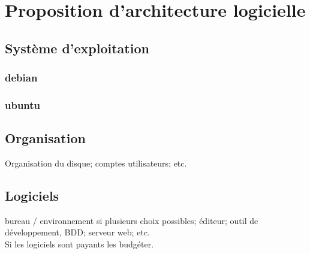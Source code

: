 \chapter{Proposition d'architecture logicielle}

\section{Système d'exploitation}

\subsection{debian}

\subsection{ubuntu}

\section{Organisation}

Organisation du disque; comptes utilisateurs; etc.

\section{Logiciels}

bureau / environnement si plusieurs choix possibles; éditeur; outil de développement, BDD; serveur web; etc.\\

Si les logiciels sont payants les budgéter.
